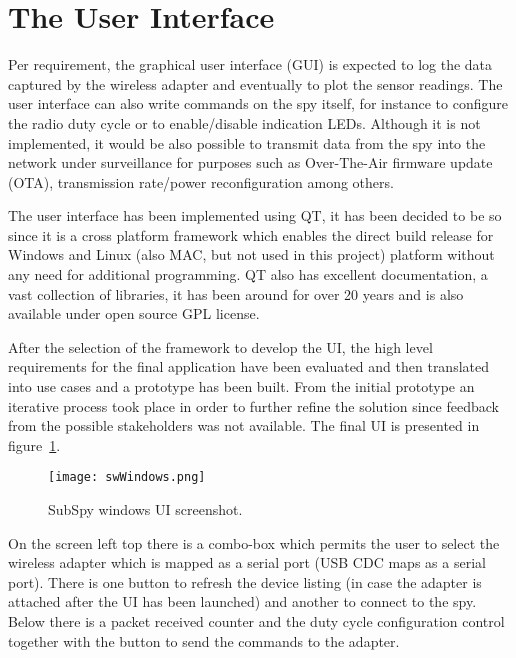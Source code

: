 \documentclass[12pt]{article}
\begin{document}
\newpage
\section{The User Interface}
\label{userInterface}
Per requirement, the graphical user interface (GUI) is expected to log the data captured by the wireless adapter and eventually to plot the sensor readings. The user interface can also write commands on the spy itself, for instance to configure the radio duty cycle or to enable/disable indication LEDs. Although it is not implemented, it would be also possible to transmit data from the spy into the network under surveillance for purposes such as Over-The-Air firmware update (OTA), transmission rate/power reconfiguration among others.

The user interface has been implemented using QT, it has been decided to be so since it is a cross platform framework which enables the direct build release for Windows and Linux (also MAC, but not used in this project) platform without any need for additional programming. QT also has excellent documentation, a vast collection of libraries, it has been around for over 20 years and is also available under open source GPL license.

After the selection of the framework to develop the UI, the high level requirements for the final application have been evaluated and then translated into use cases and a prototype has been built. From the initial prototype an iterative process took place in order to further refine the solution since feedback from the possible stakeholders was not available. The final UI is presented in figure~\ref{fig:swWindows}.

\begin{figure}[H]
    \centering
    \texttt{[image: swWindows.png]}
    \caption{SubSpy windows UI screenshot.}
    \label{fig:swWindows}
\end{figure}

On the screen left top there is a combo-box which permits the user to select the wireless adapter which is mapped as a serial port (USB CDC maps as a serial port). There is one button to refresh the device listing (in case the adapter is attached after the UI has been launched) and another to connect to the spy. Below there is a packet received counter and the duty cycle configuration control together with the button to send the commands to the adapter.
\end{document}
